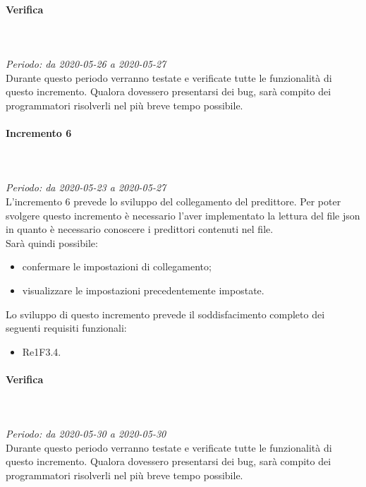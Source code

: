 \paragraph*{Verifica}\mbox{} \\ \mbox{} \\ 
\textit{Periodo: da 2020-05-26 a 2020-05-27}\\
Durante questo periodo verranno testate e verificate tutte le funzionalità di questo incremento. Qualora dovessero presentarsi dei bug, sarà compito dei programmatori risolverli nel più breve tempo possibile.

\paragraph{Incremento 6}\mbox{} \\ \mbox{} \\ 
\textit{Periodo: da 2020-05-23 a 2020-05-27}\\
L’incremento 6 prevede lo sviluppo del collegamento del predittore. Per poter svolgere questo incremento è necessario l'aver implementato la lettura del file json in quanto è necessario conoscere i predittori contenuti nel file. \\
Sarà quindi possibile:
\begin{itemize}
	\item confermare le impostazioni di collegamento;
	\item visualizzare le impostazioni precedentemente impostate.
\end{itemize}
Lo sviluppo di questo incremento prevede il soddisfacimento completo dei seguenti requisiti funzionali:
\begin{itemize}
\item Re1F3.4.
\end{itemize}
\paragraph*{Verifica}\mbox{} \\ \mbox{} \\ 
\textit{Periodo: da 2020-05-30 a 2020-05-30}\\
Durante questo periodo verranno testate e verificate tutte le funzionalità di questo incremento. Qualora dovessero presentarsi dei bug, sarà compito dei programmatori risolverli nel più breve tempo possibile.

